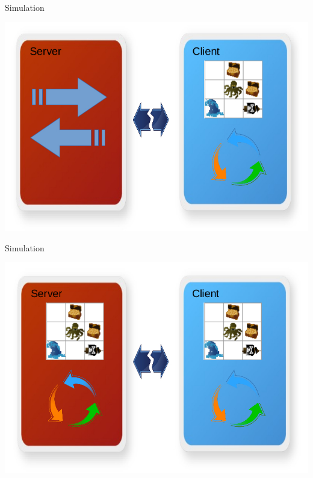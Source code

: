 \begin{frame}
	Simulation
	\begin{center}
		\includegraphics[scale=0.5]{simulation/Simulation2.jpg}
	\end{center}
\end{frame}

\begin{frame}
	Simulation
	\begin{center}
		\includegraphics[scale=0.5]{simulation/Simulation3.jpg}
	\end{center}
\end{frame}

